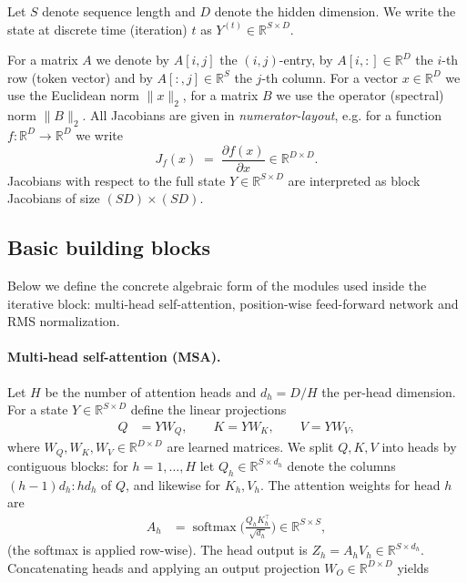 \documentclass{zapiski}
\theoremstyle{plain}
\theoremstyle{definition}
\theoremstyle{remark}
\begin{document}
Let $S$ denote sequence length and $D$ denote the hidden dimension. We write the state at
discrete time (iteration) $t$ as $ Y^{(t)} \in \mathbb{R}^{S\times D}.$

For a matrix $A$ we denote by $A[i,j]$ the $(i,j)$-entry, by $A[i,:]\in\mathbb{R}^D$ the $i$-th row
(token vector) and by $A[:,j]\in\mathbb{R}^S$ the $j$-th column. For a vector $x\in\mathbb{R}^D$
we use the Euclidean norm $\|x\|_2$, for a matrix $B$ we use the operator (spectral) norm
$\|B\|_2$. All Jacobians are given in \emph{numerator-layout}, e.g. for a function
$f:\mathbb{R}^D\to\mathbb{R}^D$ we write
\[
J_f(x) \;=\; \frac{\partial f(x)}{\partial x} \in \mathbb{R}^{D\times D}.
\]
Jacobians with respect to the full state $Y\in\mathbb{R}^{S\times D}$ are interpreted as
block Jacobians of size $(SD)\times (SD)$.

\subsection{Basic building blocks}
\label{ssec:blocks}

Below we define the concrete algebraic form of the modules used inside the iterative block:
multi-head self-attention, position-wise feed-forward network and RMS normalization.

\paragraph{Multi-head self-attention (MSA).}
\label{sssec:msa}

Let $H$ be the number of attention heads and $d_h = D/H$ the per-head dimension. For a state
$Y\in\mathbb{R}^{S\times D}$ define the linear projections
\begin{align}
Q &= Y W_Q,\qquad K = Y W_K,\qquad V = Y W_V, \label{eq:proj}
\end{align}
where $W_Q,W_K,W_V\in\mathbb{R}^{D\times D}$ are learned matrices. We split $Q,K,V$ into heads
by contiguous blocks: for $h=1,\dots,H$ let $Q_h\in\mathbb{R}^{S\times d_h}$ denote the columns
$(h-1)d_h{:}hd_h$ of $Q$, and likewise for $K_h,V_h$. The attention weights for head $h$ are
\begin{align}
A_h &= \operatorname{softmax}\!\Big(\frac{Q_h K_h^\top}{\sqrt{d_h}}\Big)\in\mathbb{R}^{S\times S},
\end{align}
(the softmax is applied row-wise). The head output is $Z_h = A_h V_h\in\mathbb{R}^{S\times d_h}$.
Concatenating heads and applying an output projection $W_O\in\mathbb{R}^{D\times D}$ yields
\end{document}
